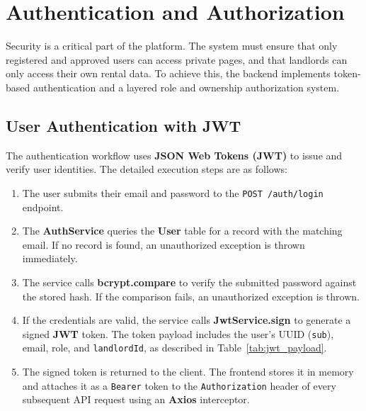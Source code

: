 \section{Authentication and Authorization}

Security is a critical part of the platform. The system must ensure that only registered and approved users can access private pages, and that landlords can only access their own rental data. To achieve this, the backend implements token-based authentication and a layered role and ownership authorization system.

\subsection{User Authentication with JWT}

The authentication workflow uses \textbf{JSON Web Tokens (JWT)} to issue and verify user identities. The detailed execution steps are as follows:

\begin{enumerate}
    \item The user submits their email and password to the \texttt{POST /auth/login} endpoint.
    \item The \textbf{AuthService} queries the \textbf{User} table for a record with the matching email. If no record is found, an unauthorized exception is thrown immediately.
    \item The service calls \textbf{bcrypt.compare} to verify the submitted password against the stored hash. If the comparison fails, an unauthorized exception is thrown.
    \item If the credentials are valid, the service calls \textbf{JwtService.sign} to generate a signed \textbf{JWT} token. The token payload includes the user's UUID (\texttt{sub}), email, role, and \texttt{landlordId}, as described in Table~\ref{tab:jwt_payload}.
    \item The signed token is returned to the client. The frontend stores it in memory and attaches it as a \texttt{Bearer} token to the \texttt{Authorization} header of every subsequent API request using an \textbf{Axios} interceptor.
\end{enumerate}

